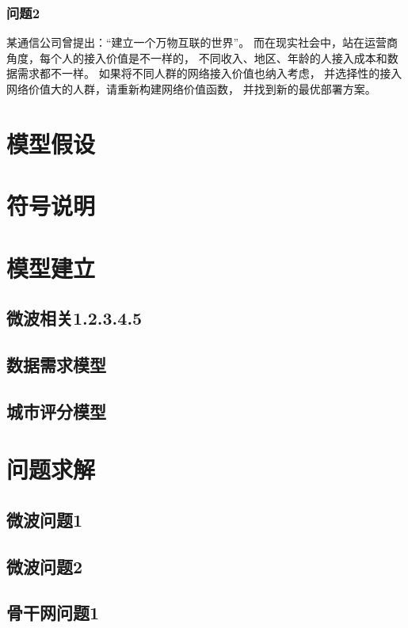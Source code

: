 \documentclass[UTF8,12pt]{ctexart}
\begin{document}
        \subsubsection{问题2}
            某通信公司曾提出：“建立一个万物互联的世界”。
            而在现实社会中，站在运营商角度，每个人的接入价值是不一样的，
            不同收入、地区、年龄的人接入成本和数据需求都不一样。
            如果将不同人群的网络接入价值也纳入考虑，
            并选择性的接入网络价值大的人群，请重新构建网络价值函数，
            并找到新的最优部署方案。
        



\section{模型假设}\label{mxjs}

\section{符号说明}

\section{模型建立}
    \subsection{微波相关1.2.3.4.5}
    \subsection{数据需求模型}
    \subsection{城市评分模型}
 

\section{问题求解}
    \subsection{微波问题1}
    \subsection{微波问题2}
    \subsection{骨干网问题1}
\end{document}
